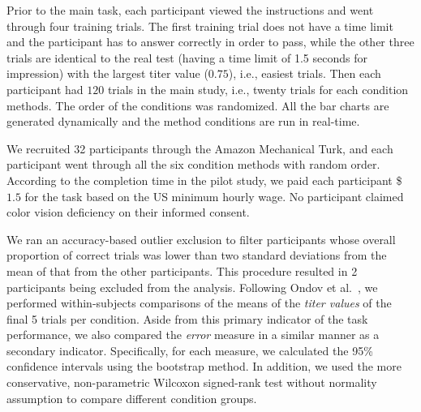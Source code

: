 {
Prior to the main task, each participant viewed the instructions and went through four training trials. The first training trial does not have a time limit and the participant has to answer correctly in order to pass, while the other three trials are identical to the real test (having a time limit of 1.5 seconds for impression) with the largest titer value ($0.75$), i.e., easiest trials. Then each participant had $120$ trials in the main study, i.e., twenty trials for each condition methods. The order of the conditions was randomized. All the bar charts are generated dynamically and the method conditions are run in real-time.

\vspace{.3em}
We recruited 32 participants through the Amazon Mechanical Turk, and each participant went through all the six condition methods with random order.
According to the completion time in the pilot study, we paid each participant \$$1.5$ for the task based on the US minimum hourly wage.
No participant claimed color vision deficiency on their informed consent.


We ran an accuracy-based outlier exclusion to filter participants whose overall proportion of correct trials was lower than two standard deviations from the mean of that from the other participants. This procedure resulted in 2 participants being excluded from the analysis. Following Ondov et al.~\cite{Ondov19}, we performed within-subjects comparisons of the means of the \emph{titer values} of the final 5 trials per condition. Aside from this primary indicator of the task performance, we also compared the \emph{error} measure in a similar manner as a secondary indicator. Specifically, for each measure, we calculated the 95\% confidence intervals using the bootstrap method. In addition, we used the more conservative, non-parametric Wilcoxon signed-rank test without normality assumption to compare different condition groups.

}
